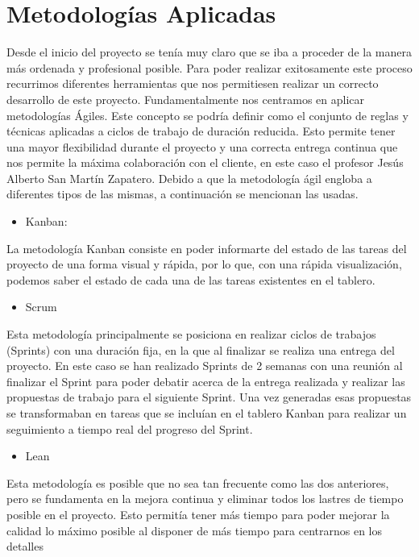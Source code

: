 
\section{Metodologías Aplicadas}

Desde el inicio del proyecto se tenía muy claro que se iba a proceder de la manera más ordenada y profesional posible. Para poder realizar exitosamente este proceso recurrimos diferentes herramientas que nos permitiesen realizar un correcto desarrollo de este proyecto.
Fundamentalmente nos centramos en aplicar metodologías Ágiles.  Este concepto se podría definir como el conjunto de reglas y técnicas aplicadas a ciclos de trabajo de duración reducida. Esto permite tener una mayor flexibilidad durante el proyecto y una correcta entrega continua que nos permite la máxima colaboración con el cliente, en este caso el profesor Jesús Alberto San Martín Zapatero.
Debido a que la metodología ágil engloba a diferentes tipos de las mismas, a continuación se mencionan las usadas.
\begin{itemize}
    \item Kanban:
\end{itemize}
 La metodología Kanban consiste en poder informarte del estado de las tareas del proyecto de una forma visual y rápida, por lo que, con una rápida visualización, podemos saber el estado de cada una de las tareas existentes en el tablero.
 \begin{itemize}
     \item Scrum
 \end{itemize}
Esta metodología principalmente se posiciona en realizar ciclos de trabajos (Sprints) con una duración fija, en la que al finalizar se realiza una entrega del proyecto. 
En este caso se han realizado Sprints de 2 semanas con una reunión al finalizar el Sprint para poder debatir acerca de la entrega realizada y realizar las propuestas de trabajo para el siguiente Sprint.
Una vez generadas esas propuestas se transformaban en tareas que se incluían en el tablero Kanban para realizar un seguimiento a tiempo real del progreso del Sprint.
\begin{itemize}
    \item Lean
\end{itemize}
Esta metodología es posible que no sea tan frecuente como las dos anteriores, pero se fundamenta en la mejora continua y eliminar todos los lastres de tiempo posible en el proyecto. Esto permitía tener más tiempo para poder mejorar la calidad lo máximo posible al disponer de más tiempo para centrarnos en los detalles


